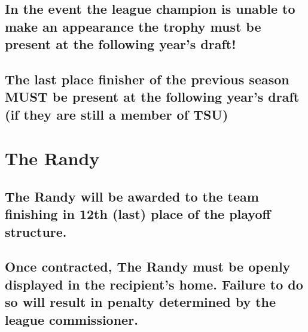 \documentclass[
]{book}
\begin{document}
\hypertarget{in-the-event-the-league-champion-is-unable-to-make-an-appearance-the-trophy-must-be-present-at-the-following-years-draft}{%
\subsection{In the event the league champion is unable to make an appearance the trophy must be present at the following year's draft!}\label{in-the-event-the-league-champion-is-unable-to-make-an-appearance-the-trophy-must-be-present-at-the-following-years-draft}}

\hypertarget{the-last-place-finisher-of-the-previous-season-must-be-present-at-the-following-years-draft-if-they-are-still-a-member-of-tsu}{%
\subsection{The last place finisher of the previous season MUST be present at the following year's draft (if they are still a member of TSU)}\label{the-last-place-finisher-of-the-previous-season-must-be-present-at-the-following-years-draft-if-they-are-still-a-member-of-tsu}}

\hypertarget{the-randy}{%
\section{The Randy}\label{the-randy}}

\hypertarget{the-randy-will-be-awarded-to-the-team-finishing-in-12th-last-place-of-the-playoff-structure.}{%
\subsection{The Randy will be awarded to the team finishing in 12th (last) place of the playoff structure.}\label{the-randy-will-be-awarded-to-the-team-finishing-in-12th-last-place-of-the-playoff-structure.}}

\hypertarget{once-contracted-the-randy-must-be-openly-displayed-in-the-recipients-home.-failure-to-do-so-will-result-in-penalty-determined-by-the-league-commissioner.}{%
\subsection{Once contracted, The Randy must be openly displayed in the recipient's home. Failure to do so will result in penalty determined by the league commissioner.}\label{once-contracted-the-randy-must-be-openly-displayed-in-the-recipients-home.-failure-to-do-so-will-result-in-penalty-determined-by-the-league-commissioner.}}
\end{document}
